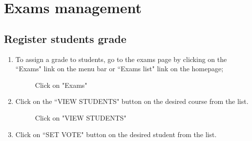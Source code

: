 \documentclass[ManualeUtente]{subfiles}
\begin{document}
\section{Exams management}
\subsection{Register students grade}
\begin{enumerate}
	\item To assign a grade to students, go to the exams page by clicking on the \textquotedblleft Exams" link on the menu bar or \textquotedblleft Exams list" link on the homepage;
	\begin{figure}[H]
		\centering
		\caption{Click on "Exams"}
		\label{fig:Click on "Exams"}
	\end{figure}
	\item Click on the \textquotedblleft VIEW STUDENTS" button on the desired course from the list.
	\begin{figure}[H]
		\centering
		\caption{Click on "VIEW STUDENTS"}
		\label{fig:Click on "VIEW STUDENTS"}
	\end{figure} \newpage
	\item Click on \textquotedblleft SET VOTE" button on the desired student from the list.
	\begin{figure}[H]
		\centering

\end{figure}
\end{enumerate}
\end{document}
